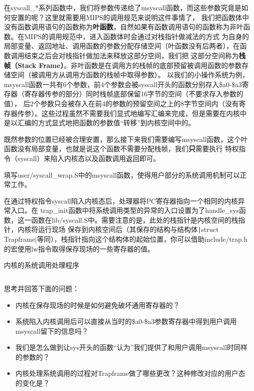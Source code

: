 在syscall\_*系列函数中，我们将参数传递给了msyscall函数，而这些参数究竟是如何安置的呢？这里就需要用MIPS的调用规范来说明这件事情了，
我们把函数体中没有函数调用语句的函数称为\textbf{叶函数}，自然如果有函数调用语句的函数称为非叶函数。在MIPS的调用规范中，进入函数体时会通过对栈指针做减法的方式
为自身的局部变量、返回地址、调用函数的参数分配存储空间（叶函数没有后两者），在函数调用结束之后会对栈指针做加法来释放这部分空间，我们把
这部分空间称为\textbf{栈帧（Stack Frame）}。非叶函数是在调用方的栈帧的底部预留被调用函数的参数存储空间（被调用方从调用方函数的栈帧中取得参数）。
以我们的小操作系统为例，msyscall函数一共有6个参数，前4个参数会被syscall开头的函数分别存入\$a0-\$a3寄存器（寄存器传参的部分）同时栈帧底部保留16字节的空间（不要求存入参数的值），
后2个参数只会被存入在前4的参数的预留空间之上的8字节空间内（没有寄存器传参）。这些过程虽然不需要我们显式地编写汇编来完成，但是需要在内核中是以汇编的方式显式地把函数的参数值“转移”到内核空间中的。

既然参数的位置已经被合理安置，那么接下来我们需要编写msyscall函数，这个叶函数没有局部变量，也就是说这个函数不需要分配栈帧，我们\textbf{只}需要执行
特权指令（syscall）来陷入内核态以及函数调用返回即可。

\begin{exercise}
填写user/syscall\_wrap.S中的msyscall函数，使得用户部分的系统调用机制可以正常工作。
\end{exercise}

在通过特权指令syscall陷入内核态后，处理器将PC寄存器指向一个相同的内核异常入口。在
trap\_init函数中将系统调用类型的异常的入口设置为了handle\_sys函数，这一函数在lib/syscall.S中。需要注意的是，此处的栈指针是内核空间的栈指针，内核将运行现场
保存到内核空间后（其保存的结构与结构体\texttt|struct Trapframe|等同），栈指针指向这个结构体的起始位置，你可以借助include/trap.h的宏使用lw指令取得保存现场的一些寄存器的值。


\begin{codeBoxWithCaption}{内核的系统调用处理程序\label{code:handlesys.S}}
  \inputminted[linenos]{gas}{codes/handlesys.S}
\end{codeBoxWithCaption}

\begin{thinking}\label{think-syscall}
 思考并回答下面的问题：
  \begin{itemize}
   \item 内核在保存现场的时候是如何避免破坏通用寄存器的？
   \item 系统陷入内核调用后可以直接从当时的\$a0-\$a3参数寄存器中得到用户调用msyscall留下的信息吗？
   \item 我们是怎么做到让sys开头的函数“认为”我们提供了和用户调用msyscall时同样的参数的？
   \item 内核处理系统调用的过程对Trapframe做了哪些更改？这种修改对应的用户态的变化是？
  \end{itemize}
\end{thinking}


